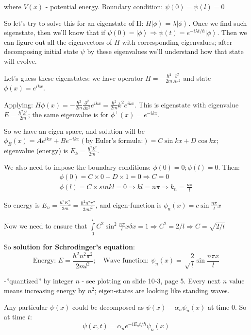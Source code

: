 \documentclass{scrartcl}
\newcommand{\ket}[1]{\left| #1 \right>} %
\begin{document}
where $V(x)$ - potential energy. Boundary condition: $\psi(0) = \psi(l) = 0$

So let's try to solve this for an eigenstate of H: $H \ket \phi = \lambda \ket
\phi$. Once we find such eigenstate, then we'll know that if $\psi(0) = \ket\phi
\Rightarrow \psi(t) = e ^ {-i \lambda t/\hbar} \ket\phi$. Then we can figure out
all the eigenvectors of $H$ with corresponding eigenvalues; after decomposing
initial state $\psi$ by these eigenvalues we'll understand how that state will
evolve.

Let's guess these eigenstates: we have operator $H = -\frac{\hbar^2}{2m}
\frac{\partial^2}{\partial x^2}$ and state $\phi(x) = e^{ikx}$.

Applying: $H \phi(x)= -\frac{\hbar^2}{2m}\frac{\partial^2}{\partial x^2} e^{ikx}
= \frac{\hbar^2}{2m} k^2 e^{ikx}$. This is eigenstate with eigenvalue $E =
\frac{\hbar^2 k^2}{2m}$; the same eigenvalue is for $\phi^\perp(x) = e^{-ikx}$.

So we have an eigen-space, and solution will be $\phi_E(x) = Ae^{ikx} +
Be^{-ikx} (\text{by Euler's formula:}) = C\sin kx + D\cos kx$; eigenvalue
(energy) is $E_k = \frac{\hbar^2 k^2}{2m}$.

We also need to impose the boundary conditions: $\phi(0) = 0; \phi(l) = 0$.
Then:
\begin{gather*}
  \phi(0) = C \times 0 + D \times 1 = 0 \Rightarrow C=0 \\
  \phi(l) = C \times sin kl = 0 \Rightarrow kl = n\pi \Rightarrow k_n =
  \frac{n\pi}l
\end{gather*}

So energy is $E_n = \frac{\hbar^2 K_n^2}{2m} = \frac{\hbar^2 n^2 \pi^2}{2ml^2}$,
and eigen-function is $\phi_n(x) = c \sin \frac{n\pi}l x$

Now we need to ensure that $\int \limits_0^l C^2 \sin^2\frac{n\pi}l x \delta x =
1 \Rightarrow C^2 = 2/l \Rightarrow C=\sqrt{2/l} $

So {\bf solution for Schrodinger's equation}:
$$\text{Energy: } E=\frac{\hbar^2 n^2 \pi^2}{2ml^2}; \quad \text{Wave function: } \psi_n(x) = \sqrt \frac2l \sin \frac{n
  \pi x}l$$

-''quantized'' by integer $n$ - see plotting on slide 10-3, page 5. Every next
$n$ value means increasing energy by $n^2$; eigen-states are looking like
standing waves.

Any particular $\psi(x)$ could be decomposed as $\psi(x) - \alpha_n \psi_n(x)$
at time 0. So at time $t$: $$\psi(x, t) = \alpha_n e^{-iE_nt/\hbar} \psi_n(x)$$
\end{document}
